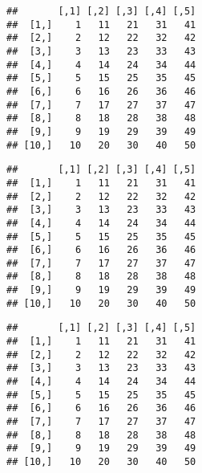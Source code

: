 \documentclass[paper=a4,10pt,div=17,headsepline,BCOR=12mm,twoside,open=right]{scrbook}\usepackage{knitr}
\begin{document}
\begin{knitrout}\footnotesize
{}\color{fgcolor}\begin{kframe}
\begin{alltt}
 \hlkwb{<-} \hlstd{(}\hlopt{:}\hlstd{,} \hlstd{)}
\end{alltt}
\begin{verbatim}
##       [,1] [,2] [,3] [,4] [,5]
##  [1,]    1   11   21   31   41
##  [2,]    2   12   22   32   42
##  [3,]    3   13   23   33   43
##  [4,]    4   14   24   34   44
##  [5,]    5   15   25   35   45
##  [6,]    6   16   26   36   46
##  [7,]    7   17   27   37   47
##  [8,]    8   18   28   38   48
##  [9,]    9   19   29   39   49
## [10,]   10   20   30   40   50
\end{verbatim}
\begin{alltt}
 \hlkwb{<-} \hlstd{(}\hlopt{:}\hlstd{,} \hlstd{,} \hlstd{)}
\end{alltt}
\begin{verbatim}
##       [,1] [,2] [,3] [,4] [,5]
##  [1,]    1   11   21   31   41
##  [2,]    2   12   22   32   42
##  [3,]    3   13   23   33   43
##  [4,]    4   14   24   34   44
##  [5,]    5   15   25   35   45
##  [6,]    6   16   26   36   46
##  [7,]    7   17   27   37   47
##  [8,]    8   18   28   38   48
##  [9,]    9   19   29   39   49
## [10,]   10   20   30   40   50
\end{verbatim}
\begin{alltt}
 \hlkwb{<-} \hlstd{(}\hlopt{:}\hlstd{,}  \hlstd{=} \hlstd{)}
\end{alltt}
\begin{verbatim}
##       [,1] [,2] [,3] [,4] [,5]
##  [1,]    1   11   21   31   41
##  [2,]    2   12   22   32   42
##  [3,]    3   13   23   33   43
##  [4,]    4   14   24   34   44
##  [5,]    5   15   25   35   45
##  [6,]    6   16   26   36   46
##  [7,]    7   17   27   37   47
##  [8,]    8   18   28   38   48
##  [9,]    9   19   29   39   49
## [10,]   10   20   30   40   50
\end{verbatim}
\begin{alltt}
 \hlkwb{<-} \hlstd{(}\hlopt{:}\hlstd{,}  \hlstd{=} \hlstd{)}
\end{alltt}

\end{kframe}
\end{knitrout}
\end{document}
